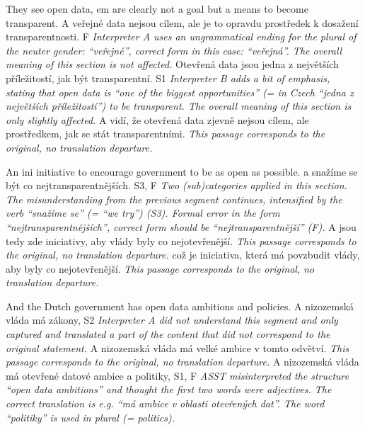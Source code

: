\documentclass[output=paper]{langscibook}
\begin{document}
\ea
  \ea
    \ea   They see open data, em are clearly not a goal but a means to become transparent.
    \ex   A veřejné data nejsou cílem, ale je to opravdu prostředek k dosažení transparentnosti.
    \ex   F
    \ex   \textit{Interpreter A uses an ungrammatical ending for the plural of the neuter gender: “veřejné”, correct form in this case: “veřejná”. The overall meaning of this section is not affected.}
    \z
  \ex
    \ea   Otevřená data jsou jedna z největších příležitostí, jak být transparentní.
    \ex   S1
    \ex   \textit{Interpreter B adds a bit of emphasis, stating that open data is “one of the biggest opportunities” (= in Czech “jedna z největších příležitostí”) to be transparent. The overall meaning of this section is only slightly affected.}
    \z
  \ex
    \ea   A vidí, že otevřená data zjevně nejsou cílem, ale prostředkem, jak se stát transparentními.
    \ex
    \ex   \textit{This passage corresponds to the original, no translation departure.}
    \z
  \z
\z

\ea
  \ea
    \ea   An ini initiative to encourage government to be as open as possible.
    \ex   a snažíme se být co nejtransparentnějších.
    \ex   S3, F
    \ex   \textit{Two (sub)categories applied in this section. The misunderstanding from the previous segment continues, intensified by the verb “snažíme se” (= “we try”) (S3). Formal error in the form “nejtransparentnějších”, correct form should be “nejtransparentnější” (F).}
    \z
  \ex
    \ea   A jsou tedy zde iniciativy, aby vlády byly co nejotevřenější.
    \ex
    \ex   \textit{This passage corresponds to the original, no translation departure.}
    \z
  \ex
    \ea   což je iniciativa, která má povzbudit vlády, aby byly co nejotevřenější.
    \ex
    \ex   \textit{This passage corresponds to the original, no translation departure.}
    \z
  \z
\z

\ea
  \ea
    \ea   And the Dutch government has open data ambitions and policies.
    \ex   A nizozemská vláda má zákony,
    \ex   S2
    \ex   \textit{Interpreter A did not understand this segment and only captured and translated a part of the content that did not correspond to the original statement.}
    \z
  \ex
    \ea   A nizozemská vláda má velké ambice v tomto odvětví.
    \ex
    \ex   \textit{This passage corresponds to the original, no translation departure.}
    \z
  \ex
    \ea   A nizozemská vláda má otevřené datové ambice a politiky,
    \ex   S1, F
    \ex   \textit{ASST misinterpreted the structure “open data ambitions” and thought the first two words were adjectives. The correct translation is e.g. “má ambice v oblasti otevřených dat”. The word “politiky” is used in plural (= politics).}
    \z
  \z
\z
\end{document}
